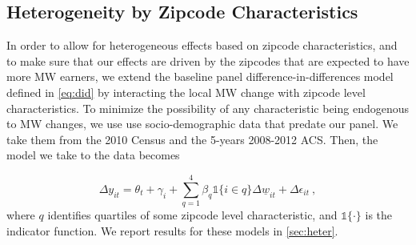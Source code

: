 \subsection{Heterogeneity by Zipcode Characteristics}

In order to allow for heterogeneous effects based on zipcode characteristics, and to make sure 
that our effects are driven by the zipcodes that are expected to have more MW earners, we extend the 
baseline panel difference-in-differences model defined in \autoref{eq:did} by interacting the local 
MW change with zipcode level characteristics. To minimize the possibility of any characteristic 
being endogenous to MW changes, we use use socio-demographic data that predate our panel. We take 
them from the 2010 Census and the 5-years 2008-2012 ACS. Then, the model we take to the data becomes

\begin{equation}\label{eq:diff_main_hetero} 
    \Delta y_{it} = \theta_t + \gamma_i 
    		+ \sum_{q = 1}^4 \beta_q \mathds{1}\{i \in q\} \Delta \underline{w}_{it} 
    		+ \Delta \epsilon_{it} \ ,
\end{equation}
where $q$ identifies quartiles of some zipcode level characteristic, and $\mathds{1}\{ \cdot \}$ is 
the indicator function. We report results for these models in \autoref{sec:heter}.



